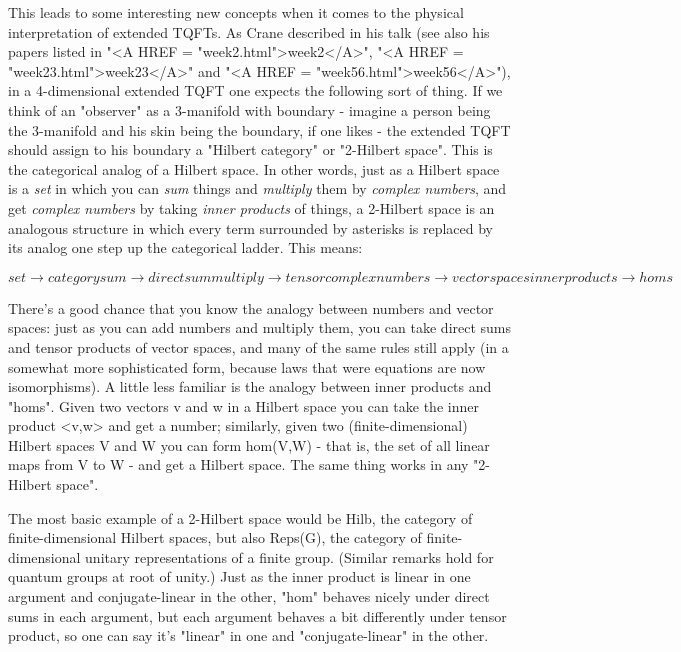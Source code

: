 This leads to some interesting new concepts when it comes to the physical
interpretation of extended TQFTs.   As Crane described in his talk
(see also his papers listed in "<A HREF = "week2.html">week2</A>", "<A HREF = "week23.html">week23</A>" and "<A HREF = "week56.html">week56</A>"), in a 
4-dimensional extended TQFT one expects the following sort of thing.  
If we think of an "observer" as a 3-manifold with boundary - 
imagine a person being the 3-manifold and his skin being the 
boundary, if one likes - the extended TQFT should assign to his boundary a 
"Hilbert category" or "2-Hilbert space".   This is the categorical analog of a
Hilbert space.  In other words, just as a Hilbert space is a \emph{set} 
in which 
you can \emph{sum} things and \emph{multiply} them 
by \emph{complex numbers}, and 
get \emph{complex numbers} by taking \emph{inner products} of things, a 
2-Hilbert space is an analogous structure in which every term 
surrounded by asterisks is replaced by its analog
one step up the categorical ladder.  This means:

$$
set             \to  category
sum             \to  direct sum
multiply        \to  tensor
complex numbers \to  vector spaces
inner products  \to  homs
$$
    

There's a good chance that you know the analogy between numbers and vector
spaces: just as you can add numbers and multiply them, you can take direct sums
and tensor products of vector spaces, and many of the same rules still 
apply (in a somewhat more sophisticated form, because laws that were 
equations are now isomorphisms).  A little less familiar is the 
analogy between inner products and "homs".  Given two vectors v and w in a 
Hilbert space you can take the inner product <v,w> and get a number; 
similarly, given two (finite-dimensional) Hilbert 
spaces V and W you can form hom(V,W) - that is, the set of all linear 
maps from V to W - and get a Hilbert space.  The same thing works in any 
"2-Hilbert space".  

The most basic example of a 2-Hilbert space would be Hilb, the category of 
finite-dimensional Hilbert spaces, but also Reps(G), the category of finite-
dimensional unitary representations of a finite group.  (Similar remarks hold 
for quantum groups at root of unity.)  Just as the inner product is linear 
in one argument and conjugate-linear in the other, "hom" behaves nicely 
under direct sums in each argument, but each argument behaves a bit 
differently under tensor product, so one can say it's "linear" in 
one and "conjugate-linear" in the other.  
      
